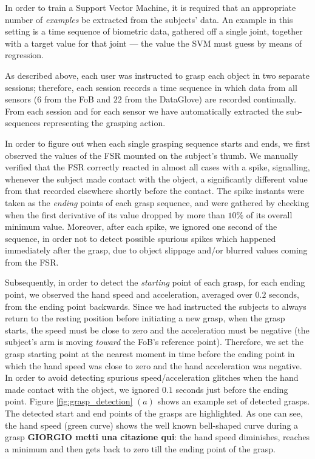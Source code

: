 In order to train a Support Vector Machine, it is required that an
appropriate number of \emph{examples} be extracted from the subjects'
data. An example in this setting is a time sequence of biometric data,
gathered off a single joint, together with a target value for that
joint --- the value the SVM must guess by means of regression.

As described above, each user was instructed to grasp each object in
two separate sessions; therefore, each session records a time sequence
in which data from all sensors ($6$ from the FoB and $22$ from the
DataGlove) are recorded continually. From each session and for each
sensor we have automatically extracted the sub-sequences representing
the grasping action.

In order to figure out when each single grasping sequence starts and
ends, we first observed the values of the FSR mounted on the subject's
thumb. We manually verified that the FSR correctly reacted in almost
all cases with a spike, signalling, whenever the subject made contact
with the object, a significantly different value from that recorded
elsewhere shortly before the contact. The spike instants were taken as
the \emph{ending} points of each grasp sequence, and were gathered by
checking when the first derivative of its value dropped by more than
$10\%$ of its overall minimum value. Moreover, after each spike, we
ignored one second of the sequence, in order not to detect possible
spurious spikes which happened immediately after the grasp, due to
object slippage and/or blurred values coming from the FSR.

Subsequently, in order to detect the \emph{starting} point of each
grasp, for each ending point, we observed the hand speed and
acceleration, averaged over $0.2$ seconds, from the ending point
backwards. Since we had instructed the subjects to always return to
the resting position before initiating a new grasp, when the grasp
starts, the speed must be close to zero and the acceleration must be
negative (the subject's arm is moving \emph{toward} the FoB's
reference point). Therefore, we set the grasp starting point at the
nearest moment in time before the ending point in which the hand speed
was close to zero and the hand acceleration was negative. In order to
avoid detecting spurious speed/acceleration glitches when the hand
made contact with the object, we ignored $0.1$ seconds just before the
ending point. Figure \ref{fig:grasp_detection} $(a)$ shows an example
set of detected grasps. The detected start and end points of the
grasps are highlighted. As one can see, the hand speed (green curve)
shows the well known bell-shaped curve during a grasp \cite{...} {\bf
GIORGIO metti una citazione qui}: the hand speed diminishes, reaches a
minimum and then gets back to zero till the ending point of the grasp.

